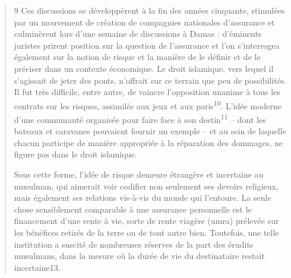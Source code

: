 \begin{quote}
9 Ces discussions se développèrent à la fin des années cinquante, stimulées par un mouvement de création de compagnies nationales d’assurance et culminèrent lors d’une semaine de discussions à Damas : d’éminents juristes prirent position sur la question de l’assurance et l’on s’interrogea également sur la notion de risque et la manière de le définir et de le préciser dans un contexte économique. Le droit islamique, vers lequel il s’agissait de jeter des ponts, n’offrait sur ce terrain que peu de possibilités. Il fut très difficile, entre autre, de vaincre l’opposition unanime à tous les contrats sur les risques, assimilés aux jeux et aux paris\textsuperscript{10}. L’idée moderne d’une communauté organisée pour faire face à son destin\textsuperscript{11} – dont les bateaux et caravanes pouvaient fournir un exemple – et au sein de laquelle chacun participe de manière appropriée à la réparation des dommages, ne figure pas dans le droit islamique. 

\newpage
Sous cette forme, l’idée de risque demeure étrangère et incertaine au musulman, qui aimerait voir codifier non seulement ses devoirs religieux, mais également ses relations vis-à-vis du monde qui l’entoure. La seule chose sensiblement comparable à une assurance personnelle est le financement d’une rente à vie, sorte de rente viagère (umra) prélevée sur les bénéfices retirés de la terre ou de tout autre bien. Toutefois, une telle institution a suscité de nombreuses réserves de la part des érudits musulmans, dans la mesure où la durée de vie du destinataire restait incertaine13.


\end{quote}
